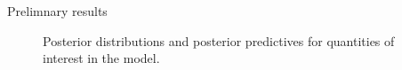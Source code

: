 \documentclass[final]{beamer}
\newlength{\sepwidth}
\newlength{\colwidth}
\newcommand{\separatorcolumn}{\begin{column}{\sepwidth}\end{column}}
\begin{document}
\begin{frame}[t]
\begin{columns}[t]
\begin{column}{\colwidth}
\begin{block}{Prelimnary results}
\begin{figure}[t!]
\begin{center}
\hfill
{}
\hfill
\end{center}

\caption{Posterior distributions and posterior predictives for quantities of interest in the model.}
\end{figure}

\end{block}


  \end{column}

  \separatorcolumn
  \end{columns}
  \end{frame}

  
\end{document}
